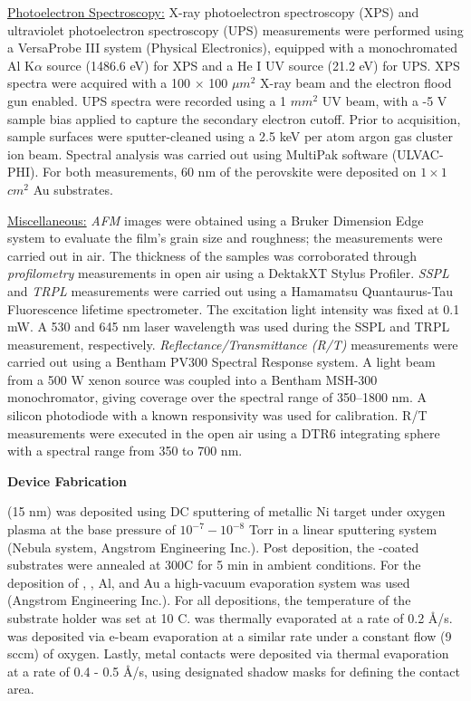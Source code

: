 \underline{Photoelectron Spectroscopy:} X-ray photoelectron spectroscopy (XPS) and ultraviolet photoelectron spectroscopy (UPS) measurements were performed using a VersaProbe III system (Physical Electronics), equipped with a monochromated Al K$\alpha$ source (1486.6 eV) for XPS and a He I UV source (21.2 eV) for UPS. XPS spectra were acquired with a 100 $\times$ 100 $\mu m^2$ X-ray beam and the electron flood gun enabled. UPS spectra were recorded using a 1 $mm^2$ UV beam, with a -5 V sample bias applied to capture the secondary electron cutoff. Prior to acquisition, sample surfaces were sputter-cleaned using a 2.5 keV per atom argon gas cluster ion beam. Spectral analysis was carried out using MultiPak software (ULVAC-PHI). For both measurements, 60 nm of the  perovskite were deposited on $1 \times 1$ $cm^2$ Au substrates. 

\underline{Miscellaneous:} \textit{AFM} images were obtained using a Bruker Dimension Edge system to evaluate the film’s grain size and roughness; the measurements were carried out in air. The thickness of the samples was corroborated through \textit{profilometry} measurements in open air using a DektakXT Stylus Profiler. \textit{SSPL} and \textit{TRPL} measurements were carried out using a Hamamatsu Quantaurus-Tau Fluorescence lifetime spectrometer. The excitation light intensity was fixed at 0.1 mW. A 530 and 645 nm laser wavelength was used during the SSPL and TRPL measurement, respectively. \textit{Reflectance/Transmittance (R/T)} measurements were carried out using a Bentham PV300 Spectral Response system. A light beam from a 500 W xenon source was coupled into a Bentham MSH-300 monochromator, giving coverage over the spectral range of 350–1800 nm. A silicon photodiode with a known responsivity was used for calibration. R/T measurements were executed in the open air using a DTR6 integrating sphere with a spectral range from 350 to 700 nm.

\textbf{Device Fabrication}

 (15 nm) was deposited using DC sputtering of metallic Ni target under oxygen plasma at the base pressure of $10^{-7}-10^{-8}$ Torr in a linear sputtering system (Nebula system, Angstrom Engineering Inc.). Post deposition, the -coated substrates were annealed at 300\degree C for 5 min in ambient conditions. For the deposition of , , Al, and Au a high-vacuum evaporation system was used (Angstrom Engineering Inc.). For all depositions, the temperature of the substrate holder was set at 10 \degree C.  was thermally evaporated at a rate of 0.2 \AA/s.  was deposited via e-beam evaporation at a similar rate under a constant flow (9 sccm) of oxygen. Lastly, metal contacts were deposited via thermal evaporation at a rate of 0.4 - 0.5 \AA/s, using designated shadow masks for defining the contact area. 

